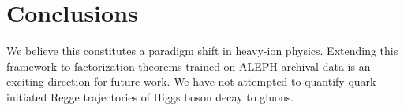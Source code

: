 \section{Conclusions}\label{sec:conclusions}

We believe this constitutes a paradigm shift in heavy-ion physics.
Extending this framework to factorization theorems trained on ALEPH
archival data is an exciting direction for future work. We have not
attempted to quantify quark-initiated Regge trajectories of Higgs boson
decay to gluons.

